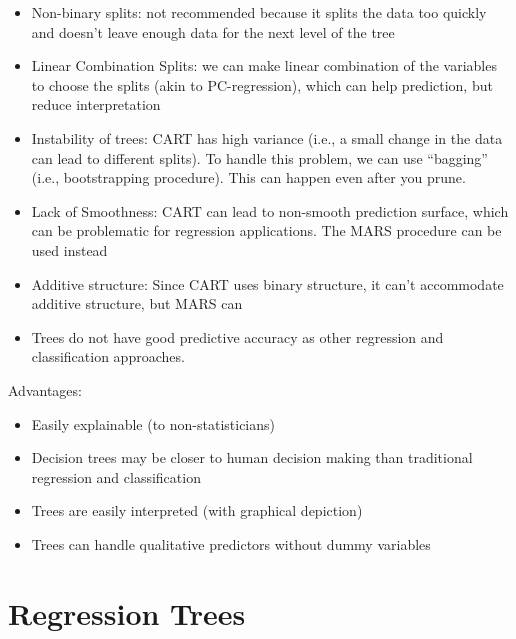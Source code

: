 \documentclass[
]{book}
\providecommand{\tightlist}{%
  \setlength{\itemsep}{0pt}\setlength{\parskip}{0pt}}
\begin{document}
\begin{itemize}
\begin{itemize}
    \begin{itemize}
    \tightlist
    \item
      For categorical variables, we can make a separate category for ``missing''. Or we can construct surrogate variables that mimic the split of the training data using only the non-missing variables
    \end{itemize}
  \item
    Non-binary splits: not recommended because it splits the data too quickly and doesn't leave enough data for the next level of the tree
  \item
    Linear Combination Splits: we can make linear combination of the variables to choose the splits (akin to PC-regression), which can help prediction, but reduce interpretation
  \item
    Instability of trees: CART has high variance (i.e., a small change in the data can lead to different splits). To handle this problem, we can use ``bagging'' (i.e., bootstrapping procedure). This can happen even after you prune.
  \item
    Lack of Smoothness: CART can lead to non-smooth prediction surface, which can be problematic for regression applications. The MARS procedure can be used instead
  \item
    Additive structure: Since CART uses binary structure, it can't accommodate additive structure, but MARS can
  \item
    Trees do not have good predictive accuracy as other regression and classification approaches.
  \end{itemize}
\end{itemize}

Advantages:

\begin{itemize}
\item
  Easily explainable (to non-statisticians)
\item
  Decision trees may be closer to human decision making than traditional regression and classification
\item
  Trees are easily interpreted (with graphical depiction)
\item
  Trees can handle qualitative predictors without dummy variables
\end{itemize}

\hfill\break

\hypertarget{regression-trees}{%
\section{Regression Trees}\label{regression-trees}}
\end{document}
